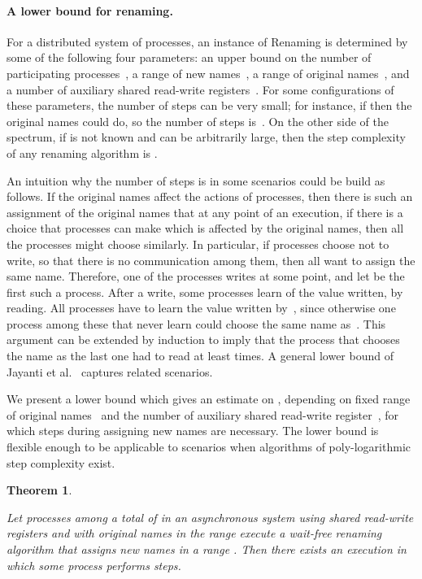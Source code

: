 \documentclass[11pt]{article}
\newcommand{\BBB}{\vspace*{-\bigskipamount}}
\newcommand{\Paragraph}[1]{\BBB\paragraph{#1}}
\newtheorem{theorem}{Theorem}
\begin{document}
\Paragraph{A lower bound for renaming.}


For a distributed system of  processes, an instance of Renaming  is determined by some of the following four  parameters: an upper bound on the number of participating processes~, a range of new names~, a range of original names~, and a number of auxiliary shared read-write registers~.
For some configurations of these parameters, the number of steps can be very small; for instance,  if  then the original names could do, so the number of steps is~. 
On the other side of the spectrum, if  is not known and can be arbitrarily large, then the step complexity of any renaming algorithm is .

An intuition why the number of steps is  in some scenarios could be build as follows. 
If the original names affect the actions of processes, then there is such an assignment of the  original names that at any point of an execution, if there is a choice that processes can make which is affected by the original names, then all the processes might choose similarly.
In particular, if processes choose not to write, so that there is no communication among them, then all want to assign the same name.
Therefore, one of the processes writes at some point, and let  be the first such a process.
After a write, some processes learn of the value written, by reading. 
All processes have to learn the value written by~, since otherwise one process among these that never learn could choose the same name as~.
This argument can be extended by induction to imply that the process that chooses the name as the last one had to read at least  times.
A general lower bound of Jayanti et al.~\cite{JayantiTT00} captures related scenarios.

We present a lower bound which gives an estimate on , depending on fixed range of original names~ and the number of auxiliary shared read-write register~, for which  steps during assigning new names are necessary.
The lower bound is flexible enough to be applicable to scenarios when algorithms of poly-logarithmic step complexity exist.




\begin{theorem}
\label{thm:rename-lower-bound}

Let  processes among a total of  in an asynchronous system using  shared read-write registers and with original names in the range  execute a wait-free renaming algorithm that assigns new names in a range . 
Then there exists an execution in which some process performs  steps.
\end{theorem}
\end{document}
